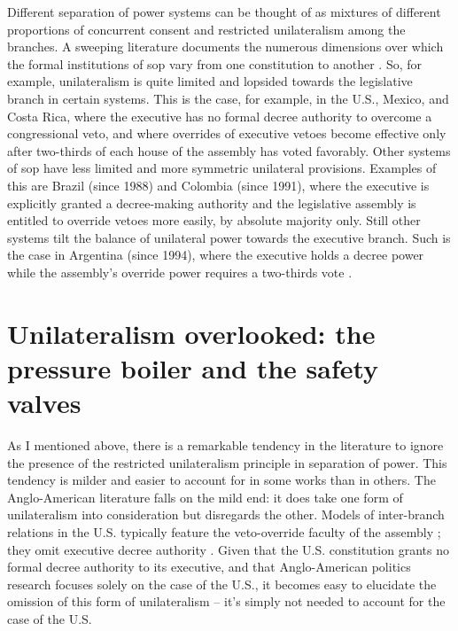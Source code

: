 Different separation of power systems can be thought of as mixtures of different proportions of concurrent consent and restricted unilateralism among the branches.  A sweeping literature documents the numerous dimensions over which the formal institutions of sop vary from one constitution to another \citep{shugart.carey.1992,mainwaring.shugart.1997,carey.shugart.1998}. So, for example, unilateralism is quite limited and lopsided towards the legislative branch in certain systems.  This is the case, for example, in the U.S., Mexico, and Costa Rica, where the executive has no formal decree authority to overcome a congressional veto, and where overrides of executive vetoes become effective only after two-thirds of each house of the assembly has voted favorably.  Other systems of sop have less limited and more symmetric unilateral provisions.  Examples of this are Brazil (since 1988) and Colombia (since 1991), where the executive is explicitly granted a decree-making authority and the legislative assembly is entitled to override vetoes more easily, by absolute majority only.  Still other systems tilt the balance of unilateral power towards the executive branch.  Such is the case in Argentina (since 1994), where the executive holds a decree power while the assembly’s override power requires a two-thirds vote \citep[150--5]{shugart.carey.1992}.

\section{Unilateralism overlooked: the pressure boiler and the safety valves}

As I mentioned above, there is a remarkable tendency in the literature to ignore the presence of the restricted unilateralism principle in separation of power.  This tendency is milder and easier to account for in some works than in others.  The Anglo-American literature falls on the mild end: it does take one form of unilateralism into consideration but disregards the other.  Models of inter-branch relations in the U.S. typically feature the veto-override faculty of the assembly \citep{lee.1975,rohde.simon.1985}; they omit executive decree authority \citep[exceptions are][]{sala.1998,moe.howell.1999}.  Given that the U.S. constitution grants no formal decree authority to its executive, and that Anglo-American politics research focuses solely on the case of the U.S., it becomes easy to elucidate the omission of this form of unilateralism – it’s simply not needed to account for the case of the U.S.  

